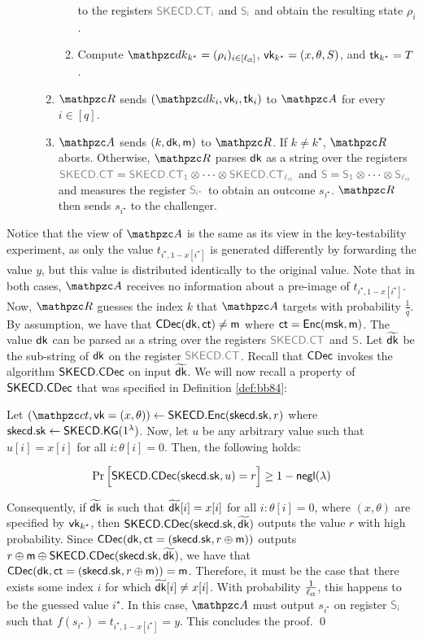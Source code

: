 \begin{description}
\begin{enumerate}
\begin{enumerate}
    to the registers $\qreg{SKECD.CT_i}$ and $\qreg{S_i}$ and obtain the resulting state $\rho_i$.
\item Compute $\qdk_{k^\star}=(\rho_i)_{i\in{[\ctlen]}}$,
$\mathsf{vk}_{k^\star}=(x,\theta,S)$, and $\mathsf{tk}_{k^\star}=T$.
\end{enumerate}

\item $\qR$ sends $(\qdk_i, \vk_i, \tk_i)$ to $\qA$ for every $i \in
[q]$.

\item $\qA$ sends $(k, \mathsf{dk}, \mathsf{m})$ to $\qR$. If $k \neq k^\star$, $\qR$
aborts. Otherwise, $\qR$ parses $\mathsf{dk}$ 
as a string over the registers $\qreg{SKECD.CT} = \qreg{SKECD.CT_1}
\otimes \cdots \otimes
\qreg{SKECD.CT_{\ctlen}}$ and $\qreg{S} = \qreg{S_1} \otimes
\cdots \otimes \qreg{S_{\ctlen}}$ and measures the register
$\qreg{S_{i^\star}}$ to obtain an outcome $s_{i^\star}$. $\qR$
then sends $s_{i^\star}$ to the challenger.
\end{enumerate}
\end{description}

Notice that the view of $\qA$ is the same as its view in the
key-testability experiment, as only the value $t_{i^\star,
1-x[i^\star]}$ is generated differently by forwarding the value $y$,
but this value is distributed identically to the original value.
Note that in both cases, $\qA$ receives no information about a
pre-image of $t_{i^\star, 1-x[i^\star]}$.
Now, $\qR$ guesses the index $k$ that $\qA$ targets with probability
$\frac1q$. By assumption, we have that $\mathsf{CDec}(\mathsf{dk}, \mathsf{ct})
\neq \mathsf{m}$ where $\mathsf{ct} = \mathsf{Enc}(\mathsf{msk}, \mathsf{m})$. The value $\mathsf{dk}$ can be
parsed as a string over the registers $\qreg{SKECD.CT}$ and
$\qreg{S}$. Let $\widetilde{\mathsf{dk}}$ be the sub-string of $\mathsf{dk}$ on the
register $\qreg{SKECD.CT}$. Recall that $\mathsf{CDec}$ invokes the
algorithm $\mathsf{SKECD}.\mathsf{CDec}$ on input $\widetilde{\mathsf{dk}}$. We will
now recall a property of $\mathsf{SKECD}.\mathsf{CDec}$ that was specified in
Definition \ref{def:bb84}:

Let $(\qct, \vk = (x, \theta)) \gets \SKECD.\Enc(\skecd.\sk, r)$
where $\mathsf{skecd}.\mathsf{sk} \leftarrow \mathsf{SKECD}.\mathsf{KG}(1^\lambda)$. Now, let $u$ be any
arbitrary value such that $u[i] = x[i]$ for all $i : \theta[i] = 0$.
Then, the following holds:

$$\Pr\Big[\mathsf{SKECD}.\mathsf{CDec}(\mathsf{skecd}.\mathsf{sk}, u) = r\Big] \ge 1 -
{\mathsf{negl}}(\lambda)$$

Consequently, if $\widetilde{\mathsf{dk}}$ is such that $\widetilde{\mathsf{dk}}[i]
= x[i]$ for all $i: \theta[i] = 0$, where $(x, \theta)$ are
specified by $\mathsf{vk}_{k^\star}$, then $\mathsf{SKECD}.\mathsf{CDec}(\mathsf{skecd}.\mathsf{sk},
\widetilde{\mathsf{dk}})$ outputs the value $r$ with high probability. Since
$\mathsf{CDec}(\mathsf{dk}, \mathsf{ct} = (\mathsf{skecd}.\mathsf{sk}, r \oplus \mathsf{m}))$ outputs $r \oplus \mathsf{m} \oplus
\mathsf{SKECD}.\mathsf{CDec}(\mathsf{skecd}.\mathsf{sk}, \widetilde{\mathsf{dk}})$, we have that
$\mathsf{CDec}(\mathsf{dk}, \mathsf{ct} = (\mathsf{skecd}.\mathsf{sk}, r \oplus \mathsf{m})) = \mathsf{m}$. Therefore, it must
be the case that there exists some index $i$ for which
$\widetilde{\mathsf{dk}}[i] \neq x[i]$. With probability $\frac{1}{\ell_{\mathsf{ct}}}$,
this happens to be the guessed value $i^\star$.  In this case, $\qA$
must output $s_{i^\star}$ on register $\qreg{S_i}$ such that
$f(s_{i^\star}) = t_{i^\star, 1 - x[i^\star]} = y$. This concludes
the proof. \qed

